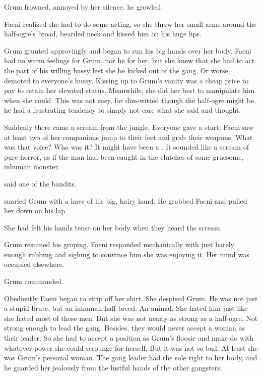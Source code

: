 Grum frowned, annoyed by her silence. 
 he growled.

Faeni realized she had to do some acting, so she threw her small arms around the half-ogre's broad, bearded neck and kissed him on his huge lips.

Grum grunted approvingly and began to run his big hands over her body.
Faeni had no warm feelings for Grum, nor he for her, but she knew that she had to act the part of his willing hussy lest she be kicked out of the gang. 
Or worse, demoted to everyone's hussy. 
Kissing up to Grum's vanity was a cheap price to pay to retain her elevated status. 
Meanwhile, she did her best to manipulate him when she could. 
This was not easy, for dim-witted though the half-ogre might be, he had a frustrating tendency to simply not care what she said and thought. 

Suddenly there came a scream from the jungle.
Everyone gave a start; Faeni saw at least two of her companions jump to their feet and grab their weapons. 
What was that voice?
Who was it?
It might have been a \human. 
It sounded like a scream of pure horror, as if the man had been caught in the clutches of some gruesome, inhuman monster.

 said one of the bandits. 

 snarled Grum with a have of his big, hairy hand.
He grabbed Faeni and pulled her down on his lap

She had felt his hands tense on her body when they heard the scream. 

Grum resumed his groping. 
Faeni responded mechanically with just barely enough rubbing and sighing to convince him she was enjoying it. 
Her mind was occupied elsewhere. 

 Grum commanded. 

Obediently Faeni began to strip off her shirt. 
She despised Grum. 
He was not just a stupid brute, but an inhuman half-breed.
An animal. 
She hated him just like she hated most of these men. 
But she was not nearly as strong as a half-ogre.
Not strong enough to lead the gang. 
Besides, they would never accept a woman as their leader. 
So she had to accept a position as Grum's floosie and make do with whatever power she could scrounge for herself.
But it was not so bad. 
At least she was Grum's personal woman.
The gang leader had the sole right to her body, and he guarded her jealously from the lustful hands of the other gangsters. 

